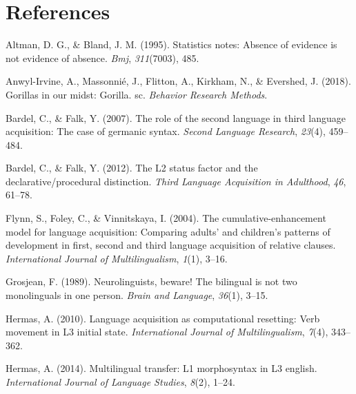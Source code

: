 \documentclass[
  man]{apa6}
\newlength{\cslhangindent}
\newlength{\cslentryspacingunit} %
\newenvironment{CSLReferences}[2] %
 {%
  \setlength{\parindent}{0pt}
  \ifodd #1
  \let\oldpar\par
  \def\par{\hangindent=\cslhangindent\oldpar}
  \fi
  \setlength{\parskip}{#2\cslentryspacingunit}
 }%
 {}
\begin{document}
\newpage

\hypertarget{references}{%
\section{References}\label{references}}

\begingroup
\setlength{\parindent}{-0.5in}
\setlength{\leftskip}{0.5in}

\hypertarget{refs}{}
\begin{CSLReferences}{1}{0}
\leavevmode{}%
Altman, D. G., \& Bland, J. M. (1995). Statistics notes: Absence of evidence is not evidence of absence. \emph{Bmj}, \emph{311}(7003), 485.

\leavevmode{}%
Anwyl-Irvine, A., Massonnié, J., Flitton, A., Kirkham, N., \& Evershed, J. (2018). Gorillas in our midst: Gorilla. sc. \emph{Behavior Research Methods}.

\leavevmode{}%
Bardel, C., \& Falk, Y. (2007). The role of the second language in third language acquisition: The case of germanic syntax. \emph{Second Language Research}, \emph{23}(4), 459--484.

\leavevmode{}%
Bardel, C., \& Falk, Y. (2012). The L2 status factor and the declarative/procedural distinction. \emph{Third Language Acquisition in Adulthood}, \emph{46}, 61--78.

\leavevmode{}%
Flynn, S., Foley, C., \& Vinnitskaya, I. (2004). The cumulative-enhancement model for language acquisition: Comparing adults' and children's patterns of development in first, second and third language acquisition of relative clauses. \emph{International Journal of Multilingualism}, \emph{1}(1), 3--16.

\leavevmode{}%
Grosjean, F. (1989). Neurolinguists, beware! The bilingual is not two monolinguals in one person. \emph{Brain and Language}, \emph{36}(1), 3--15.

\leavevmode{}%
Hermas, A. (2010). Language acquisition as computational resetting: Verb movement in L3 initial state. \emph{International Journal of Multilingualism}, \emph{7}(4), 343--362.

\leavevmode{}%
Hermas, A. (2014). Multilingual transfer: L1 morphosyntax in L3 english. \emph{International Journal of Language Studies}, \emph{8}(2), 1--24.


\end{CSLReferences}
\end{document}
